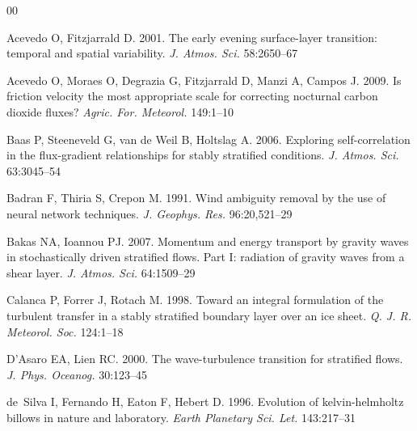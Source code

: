 \documentclass{ar-1col}
\begin{document}
\begin{thebibliography}{00}

Acevedo O, Fitzjarrald D. 2001.
The early evening surface-layer transition: temporal and spatial variability.
\textit{J. Atmos. Sci.} 58:2650--67

Acevedo O, Moraes O, Degrazia G, Fitzjarrald D, Manzi A, Campos J. 2009.
Is friction velocity the most appropriate scale for correcting nocturnal carbon
  dioxide fluxes?
\textit{Agric. For. Meteorol.} 149:1--10

Baas P, Steeneveld G, {van de Weil} B, Holtslag A. 2006.
Exploring self-correlation in the flux-gradient relationships for stably
  stratified conditions.
\textit{J. Atmos. Sci.} 63:3045--54

Badran F, Thiria S, Crepon M. 1991.
Wind ambiguity removal by the use of neural network techniques.
\textit{J. Geophys. Res.} 96:20,521--29

Bakas NA, Ioannou PJ. 2007.
Momentum and energy transport by gravity waves in stochastically driven
  stratified flows. {Part I}: radiation of gravity waves from a shear layer.
\textit{J. Atmos. Sci.} 64:1509--29

Calanca P, Forrer J, Rotach M. 1998.
Toward an integral formulation of the turbulent transfer in a stably stratified
  boundary layer over an ice sheet.
\textit{Q. J. R. Meteorol. Soc.} 124:1--18

D'Asaro EA, Lien RC. 2000.
The wave-turbulence transition for stratified flows.
\textit{J. Phys. Oceanog.} 30:123--45

de~Silva I, Fernando H, Eaton F, Hebert D. 1996.
Evolution of kelvin-helmholtz billows in nature and laboratory.
\textit{Earth Planetary Sci. Let.} 143:217--31 

\end{thebibliography}
\end{document}
